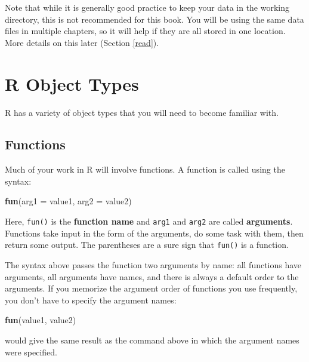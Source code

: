\documentclass[]{book}
\newenvironment{Shaded}{\begin{snugshade}}{\end{snugshade}}
\newcommand{\DataTypeTok}[1]{\textcolor[rgb]{0.13,0.29,0.53}{#1}}
\newcommand{\KeywordTok}[1]{\textcolor[rgb]{0.13,0.29,0.53}{\textbf{#1}}}
\newcommand{\NormalTok}[1]{#1}
\begin{document}
Note that while it is generally good practice to keep your data in the working directory, this is not recommended for this book. You will be using the same data files in multiple chapters, so it will help if they are all stored in one location. More details on this later (Section \ref{read}).

\hypertarget{r-object-types}{%
\section{R Object Types}\label{r-object-types}}

R has a variety of object types that you will need to become familiar with.

\hypertarget{functions}{%
\subsection{Functions}\label{functions}}

Much of your work in R will involve functions. A function is called using the syntax:

\begin{Shaded}
\begin{Highlighting}[]
\KeywordTok{fun}\NormalTok{(}\DataTypeTok{arg1 =}\NormalTok{ value1, }\DataTypeTok{arg2 =}\NormalTok{ value2)}
\end{Highlighting}
\end{Shaded}

Here, \texttt{fun()} is the \textbf{function name} and \texttt{arg1} and \texttt{arg2} are called \textbf{arguments}. Functions take input in the form of the arguments, do some task with them, then return some output. The parentheses are a sure sign that \texttt{fun()} is a function.

The syntax above passes the function two arguments by name: all functions have arguments, all arguments have names, and there is always a default order to the arguments. If you memorize the argument order of functions you use frequently, you don't have to specify the argument names:

\begin{Shaded}
\begin{Highlighting}[]
\KeywordTok{fun}\NormalTok{(value1, value2)}
\end{Highlighting}
\end{Shaded}

would give the same result as the command above in which the argument names were specified.
\end{document}
